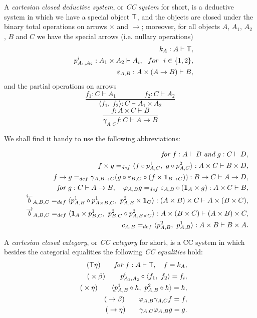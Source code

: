 \documentclass[12pt]{article}
\begin{document}
A {\it cartesian closed deductive system}, or {\it CC} {\it system} for
short, is a deductive system in which we have a special object ${\sf T}$,
and the objects are closed under the binary total operations on arrows $%
\times $ and $\rightarrow $; moreover, for all objects $A$, $A_{1}$, $A_{2}$%
, $B$ and $C$ we have the special arrows (i.e. nullary operations) 
\begin{eqnarray*}
&&k_{A}:A\vdash {\sf T}, \\
&&p_{A_{1},A_{2}}^{i}:A_{1}\times A_{2}\vdash A_{i},~~for~~i\in \{1,2\}, \\
&&\varepsilon _{A,B}:A\times (A\rightarrow B)\vdash B,
\end{eqnarray*}
and the partial operations on arrows 
\[
\frac{f_{1}:C\vdash A_{1}\qquad \qquad f_{2}:C\vdash A_{2}}{\langle
f_{1},~f_{2}\rangle :C\vdash A_{1}\times A_{2}} 
\]
\[
\frac{f:A\times C\vdash B}{\gamma _{A,C}f:C\vdash A\rightarrow B} 
\]

We shall find it handy to use the following abbreviations:

\begin{eqnarray*}
&&\text{{\it for}}{\it ~}f:A\vdash B{\it ~}\text{{\it and}}{\it ~}g:C\vdash
D, \\
&&\quad f\times g=_{def}\langle f\circ p_{A,C}^{1},~g\circ
p_{A,C}^{2}\rangle :A\times C\vdash B\times D, \\
&&\quad f\rightarrow g=_{def}\gamma _{A,B\rightarrow C}(g\circ \varepsilon
_{B,C}\circ (f\times {\bf 1}_{B\rightarrow C})):B\rightarrow C\vdash
A\rightarrow D,\bigskip \\
&&\text{{\it for}}{\it ~}g:C\vdash A\rightarrow B,\quad \varphi
_{A,B}g=_{def}\varepsilon _{A,B}\circ ({\bf 1}_{A}\times g):A\times C\vdash
B,\bigskip \\
&&\quad \overleftarrow{b}_{A,B,C}=_{def}\langle p_{A,B}^{1}\circ p_{A\times
B,C}^{1},~p_{A,B}^{2}\times {\bf 1}_{C}\rangle :(A\times B)\times C\vdash
A\times (B\times C), \\
&&\quad \overrightarrow{b}_{A,B,C}=_{def}\langle {\bf 1}_{A}\times
p_{B,C}^{1},~p_{B,C}^{2}\circ p_{A,B\times C}^{2}\rangle :A\times (B\times
C)\vdash (A\times B)\times C, \\
&&\quad c_{A,B}=_{def}\langle p_{A,B}^{2},~p_{A,B}^{1}\rangle :A\times
B\vdash B\times A.
\end{eqnarray*}

A {\it cartesian closed category}, or {\it CC category} for short, is a CC
system in which besides the categorial equalities the following {\it CC
equalities} hold: 
\begin{eqnarray*}
&&\text{(}{\sf T}\eta \text{)}\qquad \text{{\it for}}{\it \ }f:A\vdash {\sf T%
},\quad f=k_{A},\bigskip \\
&&\text{(}\times \beta \text{)}\,\qquad p_{A_{1},A_{2}}^{i}\circ \langle
f_{1},~f_{2}\rangle =f_{i}, \\
&&\text{(}\times \eta \text{)}\qquad \langle p_{A,B}^{1}\circ
h,~p_{A,B}^{2}\circ h\rangle =h,\bigskip \\
&&\text{(}\rightarrow \beta \text{)}\qquad \varphi _{A,B}\gamma _{A,C}f=f, \\
&&\text{(}\rightarrow \eta \text{)}\qquad \gamma _{A,C}\varphi _{A,B}g=g.
\end{eqnarray*}
\end{document}
